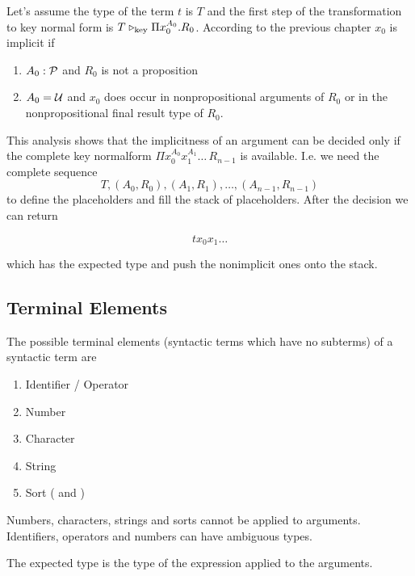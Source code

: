 Let's assume the type of the term $t$ is $T$ and the first step of the
transformation to key normal form is $T \mathrel{\triangleright}_\text{key} \Pi
x_0^{A_0}. R_0$. According to the previous chapter $x_0$ is implicit if
\begin{enumerate}

\item $A_0:{\cal{P}}$ and $R_0$ is not a proposition

\item $A_0 = {\cal{U}}$ and $x_0$ does occur in nonpropositional
  arguments of $R_0$ or in the nonpropositional final result type of $R_0$.
\end{enumerate}

This analysis shows that the implicitness of an argument can be decided only
if the complete key normalform $\Pi x_0^{A_0} x_1^{A_1} \ldots\, R_{n-1}$ is
available. I.e. we need the complete sequence
$$
   T, (A_0, R_0), (A_1, R_1), \ldots, (A_{n-1}, R_{n-1})
$$
to define the placeholders and fill the stack of placeholders. After the
decision we can return

$$
   t x_0 x_1 \ldots
$$

which has the expected type and push the nonimplicit ones onto the stack.






\subsection{Terminal Elements}

The possible terminal elements (syntactic terms which have no subterms) of a
syntactic term are
%
\begin{enumerate}

\item Identifier / Operator

\item Number

\item Character

\item String

\item Sort ( and )
\end{enumerate}

Numbers, characters, strings and sorts cannot be applied to
arguments. Identifiers, operators and numbers can have ambiguous types.

The expected type is the type of the expression applied to the arguments.

